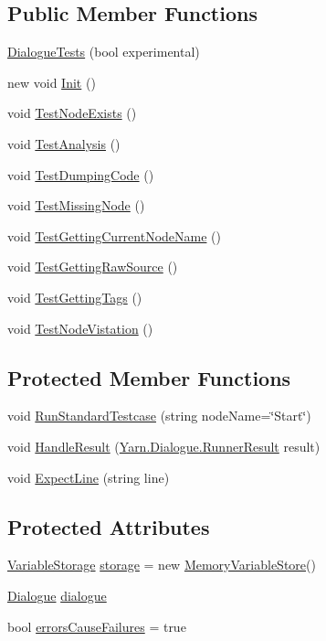 \subsection*{Public Member Functions}
\begin{DoxyCompactItemize}
\item 
\hyperlink{a00094_a4c826102af9c6b062138d72b24e7a37b}{Dialogue\-Tests} (bool experimental)
\item 
new void \hyperlink{a00094_a49813a64c710540348c15365a672e675}{Init} ()
\item 
void \hyperlink{a00094_a9d4171827bf3eba4c6ae52760a475f45}{Test\-Node\-Exists} ()
\item 
void \hyperlink{a00094_a40b0efb3cac1715b44640c29988139f1}{Test\-Analysis} ()
\item 
void \hyperlink{a00094_a111f0f8418baaeaf83cfb422c90210e0}{Test\-Dumping\-Code} ()
\item 
void \hyperlink{a00094_a013d5e3847b9d716b39aa925d70b99fd}{Test\-Missing\-Node} ()
\item 
void \hyperlink{a00094_afbb342ea64e33ee19d42a6a2c949592a}{Test\-Getting\-Current\-Node\-Name} ()
\item 
void \hyperlink{a00094_a16ed34de323da529e1a17670f556791c}{Test\-Getting\-Raw\-Source} ()
\item 
void \hyperlink{a00094_abb7bc5876ca4f37e93c6ac40bbd0e3b7}{Test\-Getting\-Tags} ()
\item 
void \hyperlink{a00094_a9c0d2732044b273929dbce35358a1906}{Test\-Node\-Vistation} ()
\end{DoxyCompactItemize}
\subsection*{Protected Member Functions}
\begin{DoxyCompactItemize}
\item 
void \hyperlink{a00170_abffa134d40d72b21e6b35c3bf05fc53f}{Run\-Standard\-Testcase} (string node\-Name=\char`\"{}Start\char`\"{})
\item 
void \hyperlink{a00170_a7b525f85a26d7c942e1cbfa5d6453893}{Handle\-Result} (\hyperlink{a00156}{Yarn.\-Dialogue.\-Runner\-Result} result)
\item 
void \hyperlink{a00170_ac21a5082ddac1da9db17ae54038df44e}{Expect\-Line} (string line)
\end{DoxyCompactItemize}
\subsection*{Protected Attributes}
\begin{DoxyCompactItemize}
\item 
\hyperlink{a00190}{Variable\-Storage} \hyperlink{a00170_a23d59ace1516ca72924c6fe3feafd3f7}{storage} = new \hyperlink{a00136}{Memory\-Variable\-Store}()
\item 
\hyperlink{a00092}{Dialogue} \hyperlink{a00170_a4cff5de56c4b8a91c76b6eb2d622a795}{dialogue}
\item 
bool \hyperlink{a00170_ac978fe85db843c51411f5517bdbe0eb8}{errors\-Cause\-Failures} = true
\end{DoxyCompactItemize}
